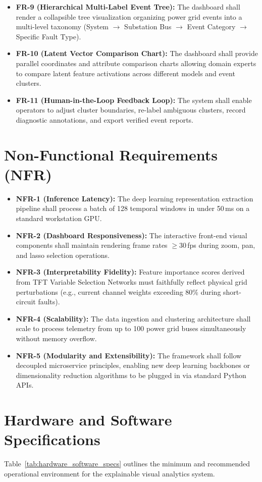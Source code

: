 \documentclass[12pt,a4paper]{report}
\begin{document}
\begin{itemize}
    \item \textbf{FR-9 (Hierarchical Multi-Label Event Tree):} The dashboard shall render a collapsible tree visualization organizing power grid events into a multi-level taxonomy (System $\to$ Substation Bus $\to$ Event Category $\to$ Specific Fault Type).
    \item \textbf{FR-10 (Latent Vector Comparison Chart):} The dashboard shall provide parallel coordinates and attribute comparison charts allowing domain experts to compare latent feature activations across different models and event clusters.
    \item \textbf{FR-11 (Human-in-the-Loop Feedback Loop):} The system shall enable operators to adjust cluster boundaries, re-label ambiguous clusters, record diagnostic annotations, and export verified event reports.
\end{itemize}

\section{Non-Functional Requirements (NFR)}
\begin{itemize}
    \item \textbf{NFR-1 (Inference Latency):} The deep learning representation extraction pipeline shall process a batch of 128 temporal windows in under 50\,ms on a standard workstation GPU.
    \item \textbf{NFR-2 (Dashboard Responsiveness):} The interactive front-end visual components shall maintain rendering frame rates $\ge 30$\,fps during zoom, pan, and lasso selection operations.
    \item \textbf{NFR-3 (Interpretability Fidelity):} Feature importance scores derived from TFT Variable Selection Networks must faithfully reflect physical grid perturbations (e.g., current channel weights exceeding 80\% during short-circuit faults).
    \item \textbf{NFR-4 (Scalability):} The data ingestion and clustering architecture shall scale to process telemetry from up to 100 power grid buses simultaneously without memory overflow.
    \item \textbf{NFR-5 (Modularity and Extensibility):} The framework shall follow decoupled microservice principles, enabling new deep learning backbones or dimensionality reduction algorithms to be plugged in via standard Python APIs.
\end{itemize}

\section{Hardware and Software Specifications}
Table~\ref{tab:hardware_software_specs} outlines the minimum and recommended operational environment for the explainable visual analytics system.
\end{document}
